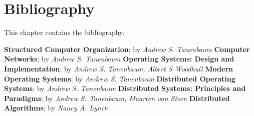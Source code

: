 
%
%

\chapter{Bibliography}

This chapter contains the bibliography.

%
%

\begin{thebibliography}{0}
    \textbf{Structured Computer Organization};
    by
    \textit{Andrew S. Tanenbaum}
    \textbf{Computer Networks};
    by
    \textit{Andrew S. Tanenbaum}
    \textbf{Operating Systems: Design and Implementation};
    by
    \textit{Andrew S. Tanenbaum, Albert S Woodhull}
    \textbf{Modern Operating Systems};
    by
    \textit{Andrew S. Tanenbaum}
    \textbf{Distributed Operating Systems};
    by
    \textit{Andrew S. Tanenbaum}
    \textbf{Distributed Systems: Principles and Paradigms};
    by
    \textit{Andrew S. Tanenbaum, Maarten van Steen}
    \textbf{Distributed Algorithms};
    by
    \textit{Nancy A. Lynch}
\end{thebibliography}
